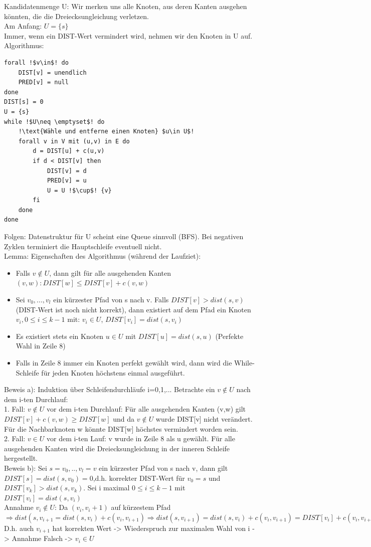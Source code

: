 \documentclass[a4paper]{article}
\begin{document}
Kandidatenmenge U: Wir merken uns alle Knoten, aus deren Kanten ausgehen könnten, die die Dreiecksungleichung verletzen.\\
Am Anfang: $U=\{s\}$\\
Immer, wenn ein DIST-Wert vermindert wird, nehmen wir den Knoten in U auf.\\
Algorithmus:
\begin{lstlisting}[escapechar=!]
forall !$v\in$! do
	DIST[v] = unendlich
	PRED[v] = null
done
DIST[s] = 0
U = {s}
while !$U\neq \emptyset$! do
	!\text{Wähle und entferne einen Knoten} $u\in U$!
	forall v in V mit (u,v) in E do
		d = DIST[u] + c(u,v)
		if d < DIST[v] then
			DIST[v] = d
			PRED[v] = u
			U = U !$\cup$! {v}
		fi
	done
done
\end{lstlisting}
Folgen: Datenstruktur für U scheint eine Queue sinnvoll (BFS). Bei negativen Zyklen terminiert die Hauptschleife eventuell nicht.\\
Lemma: Eigenschaften des Algorithmus (während der Laufziet):\begin{itemize}
\item[a)] Falls $v\not\in U$, dann gilt für alle ausgehenden Kanten $(v,w): DIST[w] \leq DIST[v]+c(v,w)$
\item[b)] Sei $v_0,...,v_l$ ein kürzester Pfad von s nach v. Falls $DIST[v]>dist(s,v)$ (DIST-Wert ist noch nicht korrekt), dann existiert auf dem Pfad ein Knoten $v_i,0\leq i \leq k-1$ mit: $v_i\in U$, $DIST[v_i]=dist(s,v_i)$
\item[c)] Es existiert stets ein Knoten $u\in U$ mit $DIST[u] = dist(s,u)$ (Perfekte Wahl in Zeile 8)
\item[d)] Falls in Zeile 8 immer ein Knoten perfekt gewählt wird, dann wird die While-Schleife für jeden Knoten höchstens einmal ausgeführt.
\end{itemize}
Beweis a): Induktion über Schleifendurchläufe i=0,1,...
Betrachte ein $v\not\in U$ nach dem i-ten Durchlauf:\\
1. Fall: $v\not\in U$ vor dem i-ten Durchlauf: Für alle ausgehenden Kanten (v,w) gilt $DIST[v] + c(v,w) \geq DIST[w]$ und da $v\not\in U$ wurde DIST[v] nicht verändert. Für die Nachbarknoten w könnte DIST[w] höchstes vermindert worden sein.\\
2. Fall: $v\in U$ vor dem i-ten Lauf: v wurde in Zeile 8 als u gewählt. Für alle ausgehenden Kanten wird die Dreiecksungleichung in der inneren Schleife hergestellt.\\
Beweis b): Sei $s=v_0,..,v_l=v$ ein kürzester Pfad von s nach v, dann gilt $DIST[s]=dist(s,v_0) = 0$,d.h. korrekter DIST-Wert für $v_0=s$ und $DIST[v_k]>dist(s,v_k)$. Sei i maximal $0\leq i \leq k-1$ mit $DIST[v_i]=dist(s,v_i)$\\
Annahme $v_i\not\in U$: Da $(v_i,v_i+1)$ auf kürzestem Pfad $\Rightarrow dist(s,v_{i+1} = dist(s,v_i)+c(v_i,v_{i+1}) \Rightarrow dist(s,v_{i+1}) = dist(s,v_i)+c(v_i,v_{i+1}) = DIST[v_i] + c(v_i,v_{i+1}) \geq DIST[v_{i+1}] \Rightarrow dist(s,v_{i+1}) = DIST[v_{i+1})$
D.h. auch $v_{i+1}$ hat korrekten Wert -> Wiederspruch zur maximalen Wahl von i -> Annahme Falsch -> $v_i \in U$\\
\end{document}
